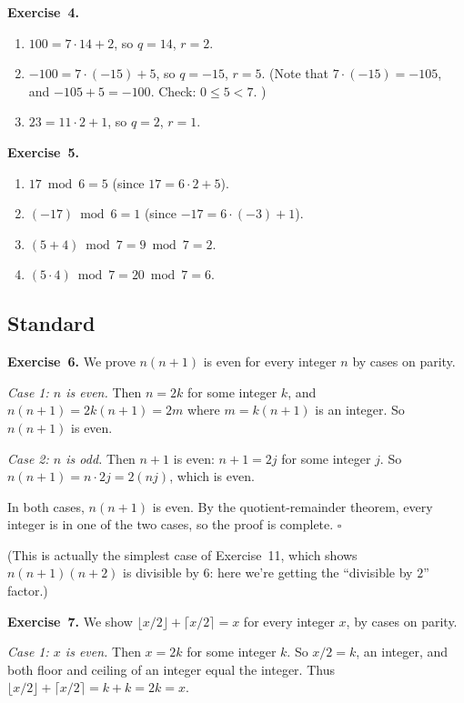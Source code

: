 \documentclass[11pt]{article}
\begin{document}
\medskip
\textbf{Exercise~4.}
\begin{enumerate}[label=(\alph*)]
  \item $100 = 7 \cdot 14 + 2$, so $q = 14$, $r = 2$.
  \item $-100 = 7 \cdot (-15) + 5$, so $q = -15$, $r = 5$. (Note that $7 \cdot (-15) = -105$, and $-105 + 5 = -100$. Check: $0 \leq 5 < 7$. \checkmark)
  \item $23 = 11 \cdot 2 + 1$, so $q = 2$, $r = 1$.
\end{enumerate}

\medskip
\textbf{Exercise~5.}
\begin{enumerate}[label=(\alph*)]
  \item $17 \bmod 6 = 5$ (since $17 = 6 \cdot 2 + 5$).
  \item $(-17) \bmod 6 = 1$ (since $-17 = 6 \cdot (-3) + 1$).
  \item $(5 + 4) \bmod 7 = 9 \bmod 7 = 2$.
  \item $(5 \cdot 4) \bmod 7 = 20 \bmod 7 = 6$.
\end{enumerate}

\subsection*{Standard}

\textbf{Exercise~6.}
We prove $n(n+1)$ is even for every integer $n$ by cases on parity.

\emph{Case 1: $n$ is even.} Then $n = 2k$ for some integer $k$, and $n(n+1) = 2k(n+1) = 2m$ where $m = k(n+1)$ is an integer. So $n(n+1)$ is even.

\emph{Case 2: $n$ is odd.} Then $n + 1$ is even: $n + 1 = 2j$ for some integer $j$. So $n(n+1) = n \cdot 2j = 2(nj)$, which is even.

In both cases, $n(n+1)$ is even. By the quotient-remainder theorem, every integer is in one of the two cases, so the proof is complete. \hfill$\square$

(This is actually the simplest case of Exercise~11, which shows $n(n+1)(n+2)$ is divisible by $6$: here we're getting the ``divisible by $2$'' factor.)

\medskip
\textbf{Exercise~7.}
We show $\lfloor x/2 \rfloor + \lceil x/2 \rceil = x$ for every integer $x$, by cases on parity.

\emph{Case 1: $x$ is even.} Then $x = 2k$ for some integer $k$. So $x/2 = k$, an integer, and both floor and ceiling of an integer equal the integer. Thus $\lfloor x/2 \rfloor + \lceil x/2 \rceil = k + k = 2k = x$. \checkmark
\end{document}

